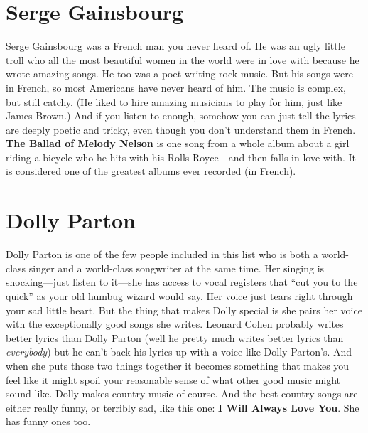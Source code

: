 \documentclass[letterpaper,single]{article}
\begin{document}
\section{Serge Gainsbourg}
Serge Gainsbourg was a French man you never heard of. 
He was an ugly little troll who all the most beautiful women in the world were in love with because he wrote amazing songs. 
He too was a poet writing rock music.
But his songs were in French, so most Americans have never heard of him. 
The music is complex, but still catchy. (He liked to hire amazing musicians to play for him, just like James Brown.)
And if you listen to enough, somehow you can just tell the lyrics are deeply poetic and tricky, even though you don't understand them in French.
\textbf{The Ballad of Melody Nelson} is one song from a whole album about a girl riding a bicycle who he hits with his Rolls Royce---and then falls in love with. 
It is considered one of the greatest albums ever recorded (in French).

\section{Dolly Parton}
Dolly Parton is one of the few people included in this list who is both a world-class singer and a world-class songwriter at the same time.
Her singing is shocking---just listen to it---she has access to vocal registers that ``cut you to the quick'' as your old humbug wizard would say. 
Her voice just tears right through your sad little heart.
But the thing that makes Dolly special is she pairs her voice with the exceptionally good songs she writes.
Leonard Cohen probably writes better lyrics than Dolly Parton (well he pretty much writes better lyrics than \emph{everybody}) but he can't back his lyrics up with a voice like Dolly Parton's.
And when she puts those two things together it becomes something that makes you feel like it might spoil your reasonable sense of what other good music might sound like.
Dolly makes country music of course. And the best country songs are either really funny, or terribly sad, like this one: \textbf{I Will Always Love You}.
She has funny ones too.
\end{document}
